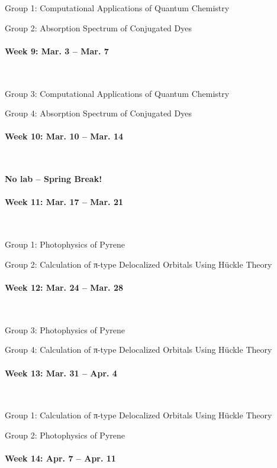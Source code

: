 \documentclass[12pt, letterpaper]{article}
\begin{document}
Group 1: Computational Applications of Quantum Chemistry

Group 2: Absorption Spectrum of Conjugated Dyes

\paragraph{Week 9: Mar. 3 -- Mar. 7}~

Group 3: Computational Applications of Quantum Chemistry

Group 4: Absorption Spectrum of Conjugated Dyes

\paragraph{Week 10: Mar. 10 -- Mar. 14}~

\textbf{No lab -- Spring Break!}

\paragraph{Week 11: Mar. 17 -- Mar. 21}~

Group 1: Photophysics of Pyrene

Group 2: Calculation of π-type Delocalized Orbitals Using Hückle Theory

\paragraph{Week 12: Mar. 24 -- Mar. 28}~

Group 3: Photophysics of Pyrene

Group 4: Calculation of π-type Delocalized Orbitals Using Hückle Theory

\paragraph{Week 13: Mar. 31 -- Apr. 4}~

Group 1: Calculation of π-type Delocalized Orbitals Using Hückle Theory

Group 2: Photophysics of Pyrene

\paragraph{Week 14: Apr. 7 -- Apr. 11}~
\end{document}
